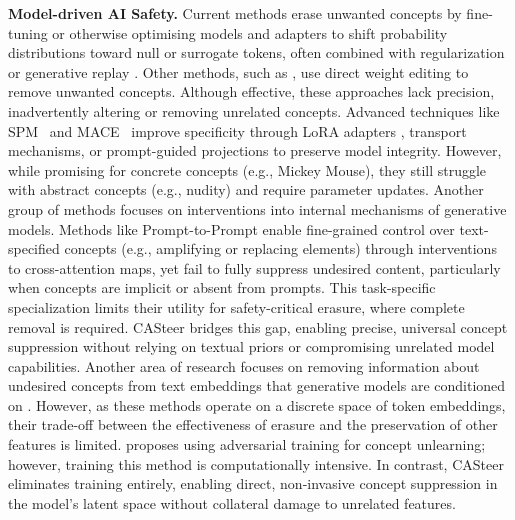 \noindent\textbf{Model-driven AI Safety.} Current methods \cite{DBLP:conf/iccv/GandikotaMFB23,DBLP:conf/iccv/KumariZWS0Z23,DBLP:conf/nips/HengS23,zhang2023forgetmenot,huang2023receler,lee2024cpe} erase unwanted concepts by fine-tuning or otherwise optimising models and adapters to shift probability distributions toward null or surrogate tokens, often combined with regularization or generative replay \cite{DBLP:conf/nips/ShinLKK17}. Other methods, such as \cite{DBLP:conf/wacv/GandikotaOBMB24,DBLP:conf/eccv/GongCWCJ24}, use direct weight editing to remove unwanted concepts.
%
Although effective, these approaches lack precision, inadvertently altering or removing unrelated concepts.
%
Advanced techniques like SPM~\cite{DBLP:conf/cvpr/Lyu0HCJ00HD24} and MACE~\cite{DBLP:conf/cvpr/LuWLLK24} improve specificity through LoRA adapters \cite{DBLP:conf/iclr/HuSWALWWC22}, transport mechanisms, or prompt-guided projections to preserve model integrity.
%
However, while promising for concrete concepts (e.g., Mickey Mouse), they still struggle with abstract concepts (e.g., nudity) and require parameter updates.
%
Another group of methods focuses on interventions into internal mechanisms of generative models. Methods like Prompt-to-Prompt \cite{DBLP:conf/iclr/HertzMTAPC23} enable fine-grained control over text-specified concepts (e.g., amplifying or replacing elements) through interventions to cross-attention maps, yet fail to fully suppress undesired content, particularly when concepts are implicit or absent from prompts. 
%
This task-specific specialization limits their utility for safety-critical erasure, where complete removal is required. 
%
CASteer bridges this gap, enabling precise, universal concept suppression without relying on textual priors or compromising unrelated model capabilities.
%
Another area of research focuses on removing information about undesired concepts from text embeddings that generative models are conditioned on \cite{DBLP:journals/corr/abs-2410-12761,DBLP:journals/corr/abs-2410-02710,DBLP:journals/corr/abs-2411-10329}. However, as these methods operate on a discrete space of token embeddings, their trade-off between the effectiveness of erasure and the preservation of other features is limited.
%
\cite{zhang2024defensive} proposes using adversarial training for concept unlearning; however, training this method is computationally intensive.
%
In contrast, CASteer eliminates training entirely, enabling direct, non-invasive concept suppression in the model’s latent space without collateral damage to unrelated features.


